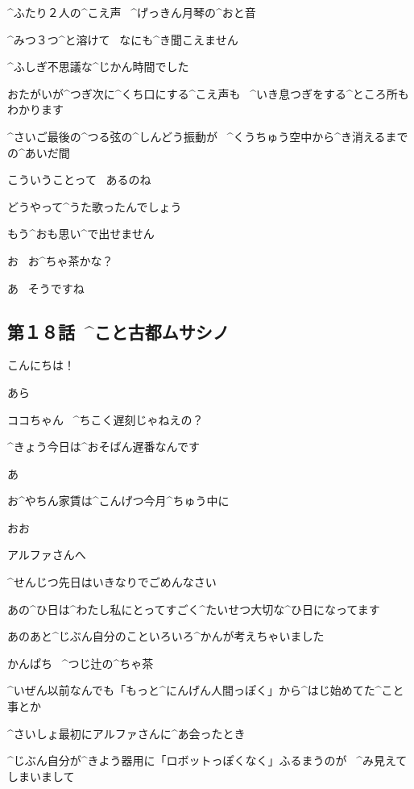 \Kokone ^{ふたり}{２人}の^{こえ}{声}
\ ^{げっきん}{月琴}の^{おと}{音}

\Kokone ^{みつ}{３つ}^{と}{溶}けて
\ なにも^{き}{聞}こえません

\page[30]
\Kokone ^{ふしぎ}{不思議}な^{じかん}{時間}でした

\Kokone おたがいが^{つぎ}{次}に^{くち}{口}にする^{こえ}{声}も
\ ^{いき}{息}つぎをする^{ところ}{所}もわかります

\page
\Kokone ^{さいご}{最後}の^{つる}{弦}の^{しんどう}{振動}が
\ ^{くうちゅう}{空中}から^{き}{消}えるまでの^{あいだ}{間}

\page[33]
\Alpha こういうことって
\ あるのね

\Kokone どうやって^{うた}{歌}ったんでしょう

\page
\Kokone もう^{おも}{思}い^{で}{出}せません

\Alpha お
\ お^{ちゃ}{茶}かな？

\Kokone あ
\ そうですね


\subsection{第１８話\ ^{こと}{古都}ムサシノ}

\page[37]
\Kokone こんにちは！

\Person あら

\Person ココちゃん
\ ^{ちこく}{遅刻}じゃねえの？

\Kokone ^{きょう}{今日}は^{おそばん}{遅番}なんです

\Kokone あ

\Kokone お^{やちん}{家賃}は^{こんげつ}{今月}^{ちゅう}{中}に

\Person おお

\page[39]
\Kokone アルファさんへ

\Kokone ^{せんじつ}{先日}はいきなりでごめんなさい

\page[41]
\Kokone あの^{ひ}{日}は^{わたし}{私}にとってすごく^{たいせつ}{大切}な^{ひ}{日}になってます

\page
\Kokone あのあと^{じぶん}{自分}のこといろいろ^{かんが}{考}えちゃいました

\Sign かんぱち
\ ^{つじ}{辻}の^{ちゃ}{茶}

\Kokone ^{いぜん}{以前}なんでも「もっと^{にんげん}{人間}っぽく」から^{はじ}{始}めてた^{こと}{事}とか

\page
\Kokone ^{さいしょ}{最初}にアルファさんに^{あ}{会}ったとき

\Kokone ^{じぶん}{自分}が^{きよう}{器用}に「ロボットっぽくなく」ふるまうのが
\ ^{み}{見}えてしまいまして

